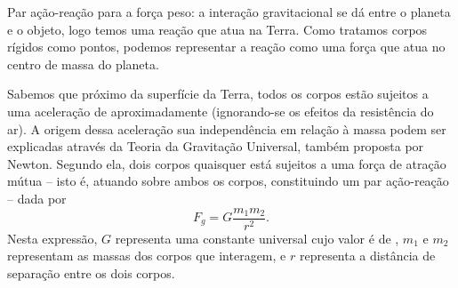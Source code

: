 \begin{marginfigure}
\centering
{}
\caption{Par ação-reação para a força peso: a interação gravitacional se dá entre o planeta e o objeto, logo temos uma reação que atua na Terra. Como tratamos corpos rígidos como pontos, podemos representar a reação como uma força que atua no centro de massa do planeta.}
\end{marginfigure}
Sabemos que próximo da superfície da Terra, todos os corpos estão sujeitos a uma aceleração de aproximadamente  (ignorando-se os efeitos da resistência do ar). A origem dessa aceleração sua independência em relação à massa podem ser explicadas através da Teoria da Gravitação Universal, também proposta por Newton. Segundo ela, dois corpos quaisquer está sujeitos a uma força de atração mútua -- isto é, atuando sobre ambos os corpos, constituindo um par ação-reação -- dada por
\begin{equation}\label{Eq:LeiGravitacaoUniversal}
  F_g = G \frac{m_1 m_2}{r^2}.
\end{equation}
%
Nesta expressão, $G$ representa uma constante universal cujo valor é de , $m_1$ e $m_2$ representam as massas dos corpos que interagem, e $r$ representa a distância de separação entre os dois corpos.

